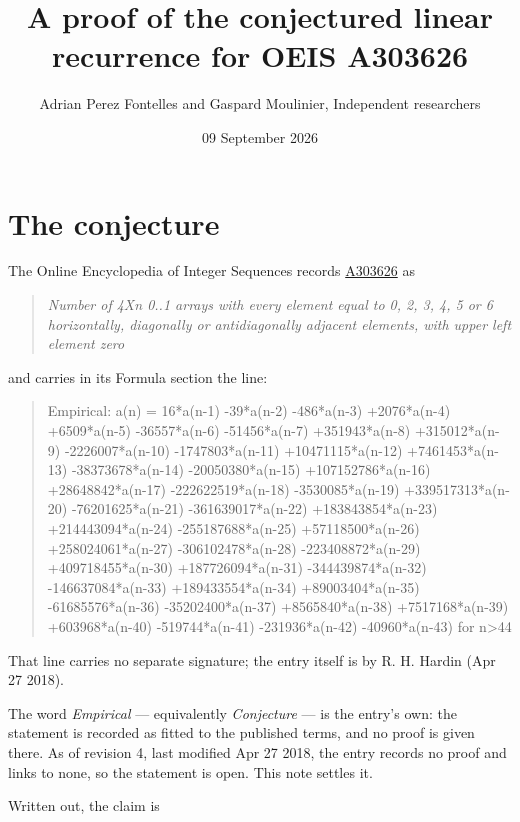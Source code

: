 \documentclass[11pt]{article}
\title{A proof of the conjectured linear recurrence for OEIS A303626}
\author{Adrian Perez Fontelles and Gaspard Moulinier, Independent researchers}
\date{09 September 2026}
\theoremstyle{definition}
\begin{document}
\maketitle
\section{The conjecture}

The Online Encyclopedia of Integer Sequences records \href{https://oeis.org/A303626}{A303626} as

\begin{quote}\itshape Number of 4Xn 0..1 arrays with every element equal to 0, 2, 3, 4, 5 or 6 horizontally, diagonally or antidiagonally adjacent elements, with upper left element zero\end{quote}

and carries in its Formula section the line:

\begin{quote}\ttfamily Empirical: a(n) = 16*a(n-1) -39*a(n-2) -486*a(n-3) +2076*a(n-4) +6509*a(n-5) -36557*a(n-6) -51456*a(n-7) +351943*a(n-8) +315012*a(n-9) -2226007*a(n-10) -1747803*a(n-11) +10471115*a(n-12) +7461453*a(n-13) -38373678*a(n-14) -20050380*a(n-15) +107152786*a(n-16) +28648842*a(n-17) -222622519*a(n-18) -3530085*a(n-19) +339517313*a(n-20) -76201625*a(n-21) -361639017*a(n-22) +183843854*a(n-23) +214443094*a(n-24) -255187688*a(n-25) +57118500*a(n-26) +258024061*a(n-27) -306102478*a(n-28) -223408872*a(n-29) +409718455*a(n-30) +187726094*a(n-31) -344439874*a(n-32) -146637084*a(n-33) +189433554*a(n-34) +89003404*a(n-35) -61685576*a(n-36) -35202400*a(n-37) +8565840*a(n-38) +7517168*a(n-39) +603968*a(n-40) -519744*a(n-41) -231936*a(n-42) -40960*a(n-43) for n>44\end{quote}

That line carries no separate signature; the entry itself is by R. H. Hardin (Apr 27 2018).

The word {\itshape Empirical} --- equivalently {\itshape Conjecture} --- is the entry's own: the statement is recorded as fitted to the published terms, and no proof is given there. As of revision 4, last modified Apr 27 2018, the entry records no proof and links to none, so the statement is open. This note settles it.

Written out, the claim is
\end{document}
